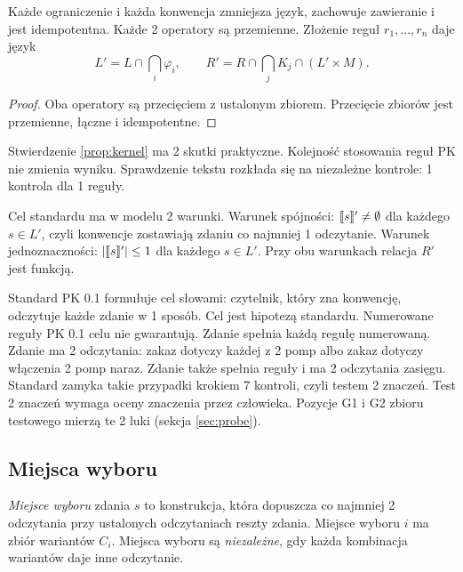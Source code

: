\begin{proposition}
\label{prop:kernel}
Każde ograniczenie i każda konwencja zmniejsza język, zachowuje zawieranie i jest
idempotentna. Każde 2 operatory są przemienne. Złożenie reguł $r_1,\dots,r_n$ daje język
\[
L'=L\cap\bigcap_i\varphi_i,\qquad R'=R\cap\bigcap_j K_j\cap(L'\times M).
\]
\end{proposition}

\begin{proof}
Oba operatory są przecięciem z ustalonym zbiorem. Przecięcie zbiorów jest przemienne,
łączne i idempotentne.
\end{proof}

Stwierdzenie \ref{prop:kernel} ma 2 skutki praktyczne. Kolejność stosowania reguł PK nie
zmienia wyniku. Sprawdzenie tekstu rozkłada się na niezależne kontrole: 1 kontrola
dla 1 reguły.

Cel standardu ma w modelu 2 warunki. Warunek spójności: $[\![s]\!]'\neq\emptyset$ dla
każdego $s\in L'$, czyli konwencje zostawiają zdaniu co najmniej 1 odczytanie. Warunek
jednoznaczności: $|[\![s]\!]'|\le 1$ dla każdego $s\in L'$. Przy obu warunkach relacja $R'$
jest funkcją.

\begin{remark}
\label{rem:gap}
Standard PK 0.1 formułuje cel słowami: czytelnik, który zna konwencję, odczytuje każde
zdanie w 1 sposób. Cel jest hipotezą standardu. Numerowane reguły PK 0.1 celu nie
gwarantują. Zdanie  spełnia każdą
regułę numerowaną. Zdanie ma 2 odczytania: zakaz dotyczy każdej z 2 pomp albo zakaz dotyczy
włączenia 2 pomp naraz. Zdanie  także
spełnia reguły i ma 2 odczytania zasięgu. Standard zamyka takie przypadki krokiem 7
kontroli, czyli testem 2 znaczeń. Test 2 znaczeń wymaga oceny znaczenia przez człowieka.
Pozycje G1 i G2 zbioru testowego mierzą te 2 luki (sekcja \ref{sec:probe}).
\end{remark}

\subsection{Miejsca wyboru}

\begin{definition}
\emph{Miejsce wyboru} zdania $s$ to konstrukcja, która dopuszcza co najmniej 2 odczytania
przy ustalonych odczytaniach reszty zdania. Miejsce wyboru $i$ ma zbiór wariantów $C_i$.
Miejsca wyboru są \emph{niezależne}, gdy każda kombinacja wariantów daje inne odczytanie.
\end{definition}

